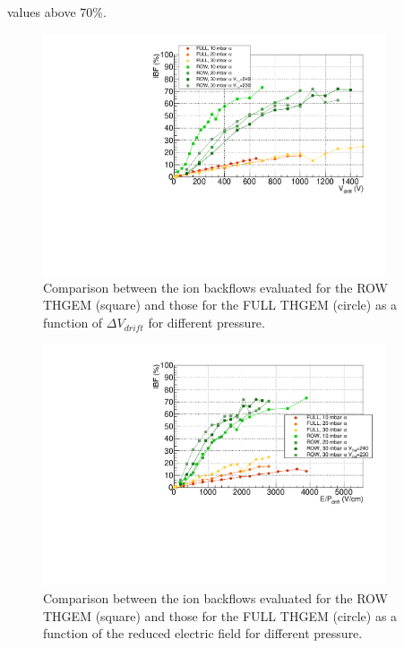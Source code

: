 \documentclass[a4paper, 11 pt]{report}
\newcommand{\Vdrift}{$ \Delta V_{drift}$}
\begin{document}
values above 70\%.
\begin{figure}[htbp]
	\centering
	\includegraphics[width=0.9\textwidth]{Immagini/IBF_ALL_Comparison_nobeam.pdf}
	\caption{Comparison between the ion backflows evaluated for the ROW THGEM (square) and those 
	for the FULL THGEM (circle) as a function of \Vdrift{} for different pressure.}
	\label{fig:ion_backflow_FULLandROW}
\end{figure}

\begin{figure}[htbp]
	\centering
	\includegraphics[width=0.9\textwidth]{Immagini/IBF_ALL_Comparison_nobeam_F.pdf}
	\caption{Comparison between the ion backflows evaluated for the ROW THGEM (square) and those 
	for the FULL THGEM (circle) as a function of the reduced electric field for different pressure.}
	\label{fig:ion_backflow_FULLandROW}
\end{figure}

\clearpage
\end{document}
